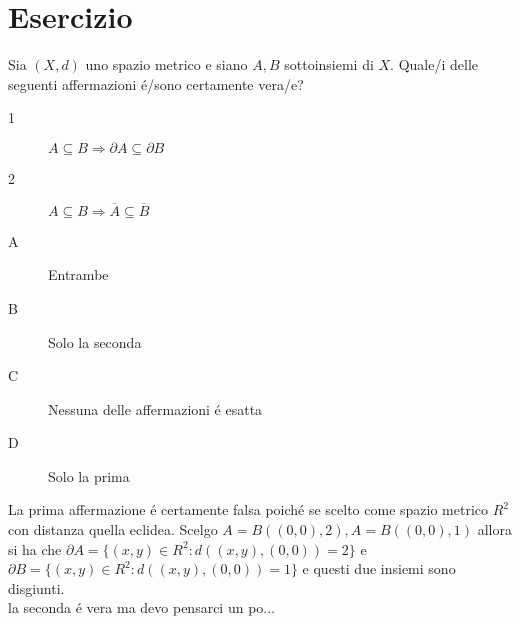 \section{Esercizio}
Sia $(X,d)$ uno spazio metrico e siano $A, B$ sottoinsiemi di $X$. Quale/i delle seguenti affermazioni \'e/sono certamente vera/e?
\begin{description}
	\item[1] $A\subseteq B\Rightarrow\partial A\subseteq \partial B$
	\item[2] $A\subseteq B\Rightarrow\overline{A}\subseteq\overline{B}$
\end{description}
\begin{description}
	\item[A] Entrambe
	\item[B] Solo la seconda
	\item[C] Nessuna delle affermazioni \'e esatta
	\item[D] Solo la prima
\end{description}
La prima affermazione \'e certamente falsa poich\'e se scelto come spazio metrico $R^2$ con distanza quella eclidea. Scelgo $A=B((0,0),2), A=B((0,0),1)$ allora si ha che $\partial A = \{(x,y)\in R^2:d((x,y),(0,0))=2\}$ e $\partial B = \{(x,y)\in R^2:d((x,y),(0,0))=1\}$ e questi due insiemi sono disgiunti.\\
la seconda \'e vera ma devo pensarci un po...\\
 


